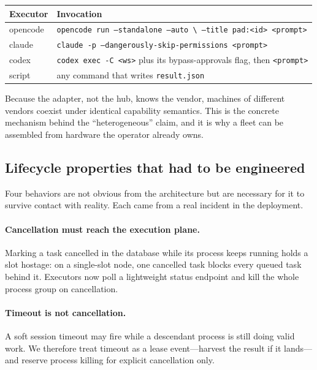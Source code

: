 \documentclass{article}
\begin{document}
\begin{center}
\scriptsize
\begin{tabular}{@{}p{}p{}@{}}
\toprule
Executor & Invocation \\
\midrule
opencode & \texttt{opencode run --standalone --auto \textbackslash
            --title pad:<id> <prompt>} \\
claude   & \texttt{claude -p --dangerously-skip-permissions <prompt>} \\
codex    & \texttt{codex exec -C <ws>} plus its
            bypass-approvals flag, then \texttt{<prompt>} \\
script   & any command that writes \texttt{result.json} \\
\bottomrule
\end{tabular}
\end{center}

Because the adapter, not the hub, knows the vendor, machines of different vendors
coexist under identical capability semantics. This is the concrete mechanism behind
the ``heterogeneous'' claim, and it is why a fleet can be assembled from hardware the
operator already owns.

\subsection{Lifecycle properties that had to be engineered}

Four behaviors are not obvious from the architecture but are necessary for it to
survive contact with reality. Each came from a real incident in the deployment.

\paragraph{Cancellation must reach the execution plane.} Marking a task cancelled in
the database while its process keeps running holds a slot hostage: on a single-slot
node, one cancelled task blocks every queued task behind it. Executors now poll a
lightweight status endpoint and kill the whole process group on cancellation.

\paragraph{Timeout is not cancellation.} A soft session timeout may fire while a
descendant process is still doing valid work. We therefore treat timeout as a lease
event---harvest the result if it lands---and reserve process killing for explicit
cancellation only.
\end{document}
